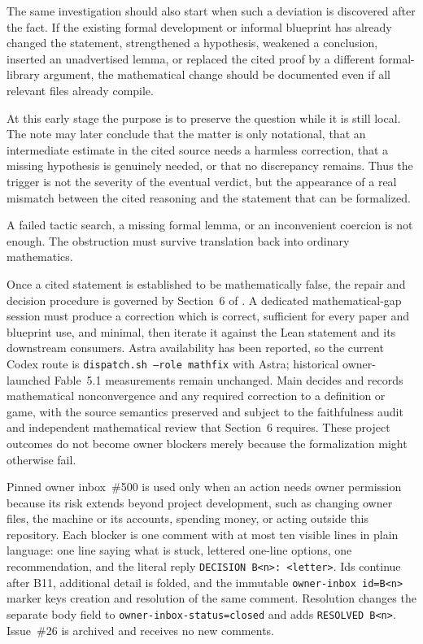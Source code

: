 \documentclass[11pt]{article}
\begin{document}
The same investigation should also start when such a deviation is discovered
after the fact.  If the existing formal development or informal blueprint has
already changed the statement, strengthened a hypothesis, weakened a conclusion,
inserted an unadvertised lemma, or replaced the cited proof by a different
formal-library argument, the mathematical change should be documented even if all
relevant files already compile.

At this early stage the purpose is to preserve the question while it is still
local.  The note may later conclude that the matter is only notational, that an
intermediate estimate in the cited source needs a harmless correction, that a
missing hypothesis is genuinely needed, or that no discrepancy remains.  Thus
the trigger is not the severity of the eventual verdict, but the appearance of a
real mismatch between the cited reasoning and the statement that can be
formalized.

A failed tactic search, a missing formal lemma, or an inconvenient coercion is
not enough.  The obstruction must survive translation back into ordinary
mathematics.

Once a cited statement is established to be mathematically false, the repair
and decision procedure is governed by Section~6 of
.  A dedicated mathematical-gap session must
produce a correction which is correct, sufficient for every paper and blueprint
use, and minimal, then iterate it against the Lean statement and its downstream
consumers.  Astra availability has been reported, so the current Codex route is
\texttt{dispatch.sh --role mathfix} with Astra; historical owner-launched
Fable~5.1 measurements remain unchanged.  Main decides and records mathematical
nonconvergence and any required correction to a definition or game, with the
source semantics preserved and subject to the faithfulness audit and
independent mathematical review that Section~6 requires.  These project
outcomes do not become owner blockers merely because the formalization might
otherwise fail.

Pinned owner inbox~\#500 is used only when an action needs owner permission
because its risk extends beyond project development, such as changing owner
files, the machine or its accounts, spending money, or acting outside this
repository.  Each blocker is one comment with at most ten visible lines in
plain language: one line saying what is stuck, lettered one-line options, one
recommendation, and the literal reply
\texttt{DECISION B<n>: <letter>}.  Ids continue after B11, additional detail is
folded, and the immutable \texttt{owner-inbox id=B<n>} marker keys creation and
resolution of the same comment.  Resolution changes the separate body field to
\texttt{owner-inbox-status=closed} and adds \texttt{RESOLVED B<n>}.  Issue~\#26
is archived and receives no new comments.
\end{document}
